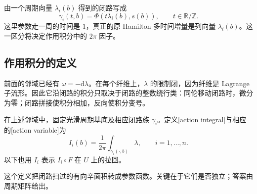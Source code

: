 由一个周期向量 \(\lambda_i(b)\) 得到的闭路写成
\begin{equation}\label{g4:eq:1102:period-cycle}
	\gamma_i(t,b)=\Phi(t\lambda_i(b),s(b)),\qquad t\in\mathbb R/\mathbb Z.
\end{equation}
这里参数走一周的时间是 \(1\)，真正的原 Hamilton 多时间增量是列向量 \(\lambda_i(b)\)。这一区分将决定作用积分中的 \(2\pi\) 因子。

\subsection{作用积分的定义}
\label{g4:subsec:1102:02}

前面的邻域已经有 \(\omega=-\mathrm{d}\lambda\)。在每个纤维上，\(\lambda\) 的限制闭，因为纤维是 Lagrange 子流形。因此它沿闭路的积分只取决于闭路的整数绕行类：同伦移动闭路时，微分为零；闭路拼接使积分相加，反向使积分变号。

\begin{definition}\label{g4:def:1102:action-variables}
	在上述邻域中，固定光滑周期基底及相应闭路族 \(\gamma_i\)。定义[action integral]与相应的[action variable]为
	\begin{equation}\label{g4:eq:1102:action-integral}
		I_i(b)=\frac1{2\pi}\int_{\gamma_i(\cdot,b)}\lambda,
		\qquad i=1,\ldots,n.
	\end{equation}
	以下也用 \(I_i\) 表示 \(I_i\circ F\) 在 \(U\) 上的拉回。
\end{definition}

这个定义把闭路扫过的有向辛面积转成参数函数。关键在于它们是否独立；答案由周期矩阵给出。

